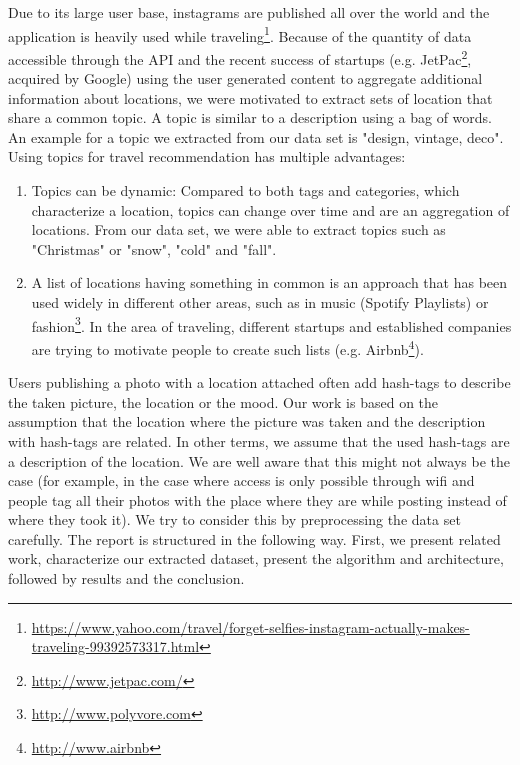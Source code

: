 Due to its large user base, instagrams are published all over the world and the application is heavily used while traveling\footnote{\url{https://www.yahoo.com/travel/forget-selfies-instagram-actually-makes-traveling-99392573317.html}}. Because of the quantity of data accessible through the API and the recent success of startups (e.g. JetPac\footnote{\url{http://www.jetpac.com/}}, acquired by Google) using the user generated content to aggregate additional information about locations, we were motivated to extract sets of location that share a common topic. A topic is similar to a description using a bag of words. An example for a topic we extracted from our data set is "design, vintage, deco". Using topics for travel recommendation has multiple advantages:
\begin{enumerate}
  \item Topics can be dynamic: Compared to both tags and categories, which characterize a location, topics can change over time and are an aggregation of locations. From our data set, we were able to extract topics such as "Christmas" or "snow", "cold" and "fall".
  \item A list of locations having something in common is an approach that has been used widely in different other areas, such as in music (Spotify Playlists) or fashion\footnote{\url{http://www.polyvore.com}}. In the area of traveling, different startups and established companies are trying to motivate people to create such lists (e.g. Airbnb\footnote{\url{http://www.airbnb}}).
\end{enumerate}

Users publishing a photo with a location attached often add hash-tags to describe the taken picture, the location or the mood. Our work is based on the assumption that the location where the picture was taken and the description with hash-tags are related. In other terms, we assume that the used hash-tags are a description of the location. We are well aware that this might not always be the case (for example, in the case where access is only possible through wifi and people tag all their photos with the place where they are while posting instead of where they took it). We try to consider this by preprocessing the data set carefully. The report is structured in the following way. First, we present related work, characterize our extracted dataset, present the algorithm and architecture, followed by results and the conclusion.

